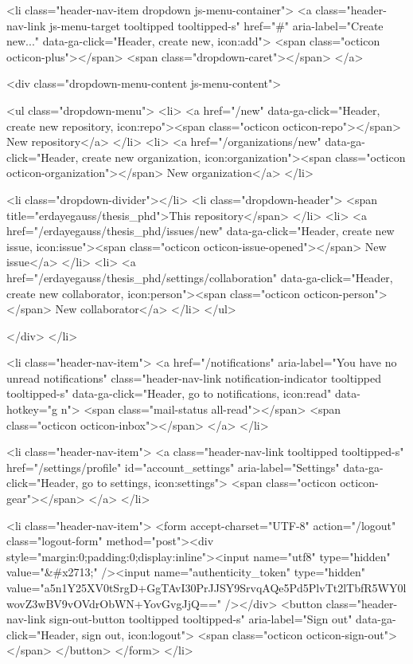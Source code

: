   <li class="header-nav-item dropdown js-menu-container">
    <a class="header-nav-link js-menu-target tooltipped tooltipped-s" href="#" aria-label="Create new..." data-ga-click="Header, create new, icon:add">
      <span class="octicon octicon-plus"></span>
      <span class="dropdown-caret"></span>
    </a>

    <div class="dropdown-menu-content js-menu-content">
      
<ul class="dropdown-menu">
  <li>
    <a href="/new" data-ga-click="Header, create new repository, icon:repo"><span class="octicon octicon-repo"></span> New repository</a>
  </li>
  <li>
    <a href="/organizations/new" data-ga-click="Header, create new organization, icon:organization"><span class="octicon octicon-organization"></span> New organization</a>
  </li>


    <li class="dropdown-divider"></li>
    <li class="dropdown-header">
      <span title="erdayegauss/thesis_phd">This repository</span>
    </li>
      <li>
        <a href="/erdayegauss/thesis_phd/issues/new" data-ga-click="Header, create new issue, icon:issue"><span class="octicon octicon-issue-opened"></span> New issue</a>
      </li>
      <li>
        <a href="/erdayegauss/thesis_phd/settings/collaboration" data-ga-click="Header, create new collaborator, icon:person"><span class="octicon octicon-person"></span> New collaborator</a>
      </li>
</ul>

    </div>
  </li>

  <li class="header-nav-item">
        <a href="/notifications" aria-label="You have no unread notifications" class="header-nav-link notification-indicator tooltipped tooltipped-s" data-ga-click="Header, go to notifications, icon:read" data-hotkey="g n">
        <span class="mail-status all-read"></span>
        <span class="octicon octicon-inbox"></span>
</a>
  </li>

  <li class="header-nav-item">
    <a class="header-nav-link tooltipped tooltipped-s" href="/settings/profile" id="account_settings" aria-label="Settings" data-ga-click="Header, go to settings, icon:settings">
      <span class="octicon octicon-gear"></span>
    </a>
  </li>

  <li class="header-nav-item">
    <form accept-charset="UTF-8" action="/logout" class="logout-form" method="post"><div style="margin:0;padding:0;display:inline"><input name="utf8" type="hidden" value="&#x2713;" /><input name="authenticity_token" type="hidden" value="a5n1Y25XV0tSrgD+GgTAvI30PrJJSY9SrvqAQe5Pd5PlvTt2lTbfR5WY0lwovZ3wBV9vOVdrObWN+YovGvgJjQ==" /></div>
      <button class="header-nav-link sign-out-button tooltipped tooltipped-s" aria-label="Sign out" data-ga-click="Header, sign out, icon:logout">
        <span class="octicon octicon-sign-out"></span>
      </button>
</form>  </li>

